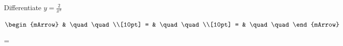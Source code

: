 \begin{mtask}
	\task \begin{exercise} Differentiate $y=\frac{2}{x^3} $
           \begin{envSolution}
             $\begin{mArrow}
                   & \quad \quad              \\[10pt]
		   		 = & \quad \quad              \\[10pt]
				 = & \quad \quad 
              \end{mArrow}$
            \begin{shortsolution}  
			     =$ \quad \quad \quad \quad$
			\end{shortsolution}				 
           \end{envSolution}
         \end{exercise}
\end{mtask}

